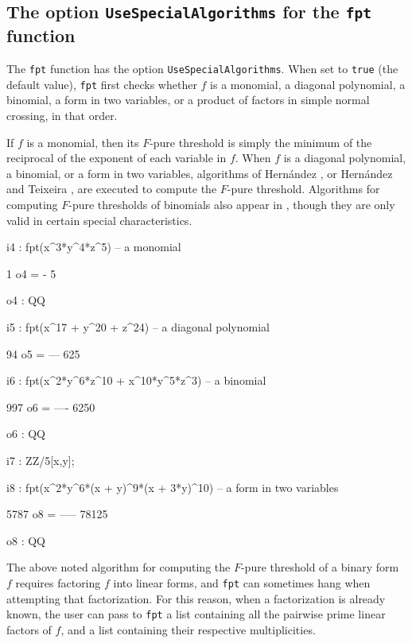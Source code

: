\documentclass{amsart}
\begin{document}
\subsection{The option {\tt UseSpecialAlgorithms} for the {\tt fpt} function}

The {\tt fpt} function has the option {\tt UseSpecialAlgorithms}.  When
set to {\tt true} (the default value), {\tt fpt} first checks whether $f$ is a monomial, a diagonal polynomial, a binomial, a form in two variables, or a product of factors in simple normal crossing, in that order. 

If $f$ is a monomial, then its $F$-pure threshold is simply the minimum of the reciprocal of the exponent of each variable in $f$.
When $f$ is a diagonal polynomial, a binomial, or a form in two variables, 
algorithms of Hern\'andez \cite{HernandezFInvariantsOfDiagonalHyp, HernandezFPureThresholdOfBinomial}, or Hern\'andez and Teixeira \cite{HernandezTeixeiraFThresholdFunctions},  are executed to compute the $F$-pure threshold.  Algorithms for computing $F$-pure thresholds of binomials also appear in \cite{ShibutaTakagiLCThresholds}, though they are only valid in certain special characteristics.

{\small
{}
\begin{MyVerbatim}

i4 : fpt(x^3*y^4*z^5) -- a monomial

      1
o4 = -
      5

o4 : QQ


i5 : fpt(x^17 + y^20 + z^24) -- a diagonal polynomial

      94
o5 = ---
     625

i6 : fpt(x^2*y^6*z^10 + x^10*y^5*z^3) -- a binomial

      997
o6 = ----
     6250

o6 : QQ

i7 : ZZ/5[x,y];

i8 : fpt(x^2*y^6*(x + y)^9*(x + 3*y)^10) -- a form in two variables

      5787
o8 = -----
     78125

o8 : QQ
\end{MyVerbatim}
}
\medspace

The above noted algorithm for computing the $F$-pure threshold of a binary form $f$ requires factoring $f$ into linear forms, and {\tt fpt} can sometimes hang when attempting that factorization. For this reason, when a factorization is already known, the user can pass to {\tt fpt} a list containing all the pairwise prime linear factors of $f$, and a list containing their respective multiplicities.
\end{document}
